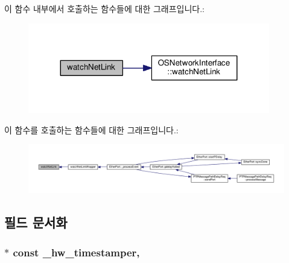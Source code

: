 이 함수 내부에서 호출하는 함수들에 대한 그래프입니다.\+:
\nopagebreak
\begin{figure}[H]
\begin{center}
\leavevmode
\includegraphics[width=299pt]{class_common_port_a7fc2ad2925376becd473fcfc684472fb_cgraph}
\end{center}
\end{figure}




이 함수를 호출하는 함수들에 대한 그래프입니다.\+:
\nopagebreak
\begin{figure}[H]
\begin{center}
\leavevmode
\includegraphics[width=350pt]{class_common_port_a7fc2ad2925376becd473fcfc684472fb_icgraph}
\end{center}
\end{figure}




\subsection{필드 문서화}
\subsubsection[{\texorpdfstring{\+\_\+hw\+\_\+timestamper}{_hw_timestamper}}]{$\ast$ const \+\_\+hw\+\_\+timestamper\hspace{0.3cm}{\ttfamily [protected]}, {\ttfamily [inherited]}}\hypertarget{class_common_port_a6b964d49ce26b21cc984b14102973f87}{}\label{class_common_port_a6b964d49ce26b21cc984b14102973f87}



